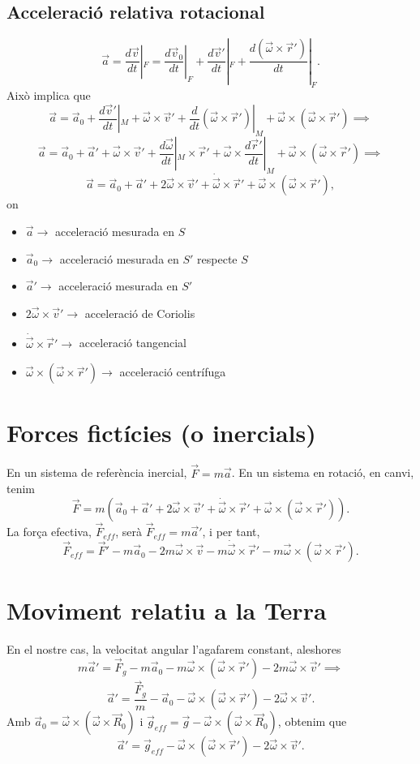 \subsection{Acceleració relativa rotacional}
\[
\vec a=\dfrac{d\vec v}{dt}|_F=\dfrac{d\vec v_0}{dt}|_F+\dfrac{d\vec v'}{dt}|_F+\dfrac{d(\vec\omega\times\vec r')}{dt}|_F.
\]
Això implica que
\[
\vec a=\vec a_0+\dfrac{d\vec v'}{dt}|_M+\vec\omega\times\vec v'+\dfrac{d}{dt}(\vec\omega\times\vec r')|_M+\vec\omega\times(\vec\omega\times\vec r')\implies
\]
\[
\vec a=\vec a_0+\vec a'+\vec\omega\times\vec v'+\dfrac{d\vec\omega}{dt}|_M\times\vec r'+\vec\omega\times\dfrac{d\vec r'}{dt}|_M+\vec\omega\times(\vec\omega\times\vec r')\implies
\]
\[
\vec a=\vec a_0+\vec a'+2\vec\omega\times\vec v'+\dot\vec\omega\times\vec r'+\vec\omega\times(\vec\omega\times\vec r'),
\]
on
\begin{itemize}
	\item $\vec a\longrightarrow$ acceleració mesurada en $S$
	\item $\vec a_0\longrightarrow$ acceleració mesurada en $S'$ respecte $S$
	\item $\vec a'\longrightarrow$ acceleració mesurada en $S'$
	\item $2\vec\omega\times\vec v'\longrightarrow$ acceleració de Coriolis
	\item $\dot\vec\omega\times\vec r'\longrightarrow$ acceleració tangencial
	\item $\vec\omega\times(\vec\omega\times\vec r')\longrightarrow$ acceleració centrífuga
\end{itemize}

\section{Forces fictícies (o inercials)}
En un sistema de referència inercial, $\vec F=m\vec a$. En un sistema en rotació, en canvi, tenim
\[\vec F=m(\vec a_0+\vec a'+2\vec\omega\times\vec v'+\dot\vec\omega\times\vec r'+\vec\omega\times(\vec\omega\times\vec r')).\]
La força efectiva, $\vec F_{eff}$, serà $\vec F_{eff}=m\vec a'$, i per tant,
\[
\vec F_{eff}=\vec F'-m\vec a_0-2m\vec\omega\times\vec v-m\dot\vec\omega\times\vec r'-m\vec\omega\times(\vec\omega\times\vec r').
\]

\section{Moviment relatiu a la Terra}
En el nostre cas, la velocitat angular l'agafarem constant, aleshores
\[
m\vec a'=\vec F_g-m\vec a_0-m\vec\omega\times(\vec\omega\times\vec r')-2m\vec\omega\times\vec v'
\implies\]
\[
\vec a'=\dfrac{\vec F_g}{m}-\vec a_0-\vec\omega\times(\vec\omega\times\vec r')-2\vec\omega\times\vec v'.
\]
Amb $\vec a_0=\vec\omega\times(\vec\omega\times\vec R_0)$ i $\vec g_{eff}=\vec g-\vec\omega\times(\vec\omega\times\vec R_0)$, obtenim que
\[
\vec a'=\vec g_{eff}-\vec\omega\times(\vec\omega\times\vec r')-2\vec\omega\times\vec v'.
\]